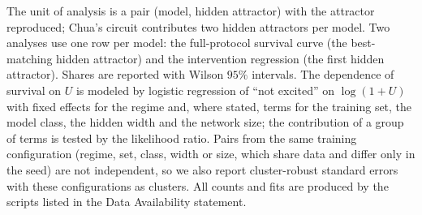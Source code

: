The unit of analysis is a pair (model, hidden attractor) with the attractor reproduced; Chua's circuit contributes two
hidden attractors per model. Two analyses use one row per model: the full-protocol survival curve (the best-matching hidden
attractor) and the intervention regression (the first hidden attractor). Shares are reported with Wilson $95\%$
intervals. The dependence of survival on $U$ is modeled by logistic regression of ``not excited'' on $\log(1+U)$ with fixed
effects for the regime and, where stated, terms for the training set, the model class, the hidden width and the network
size;\cite{Agresti2013Categorical,McCullaghNelder1989GLM} the contribution of a group of terms is tested by the likelihood
ratio. Pairs from the same training configuration (regime, set, class, width or size, which share data and differ only in
the seed) are not independent, so we also report cluster-robust standard errors with these configurations as clusters. All
counts and fits are produced by the scripts listed in the Data Availability statement.
